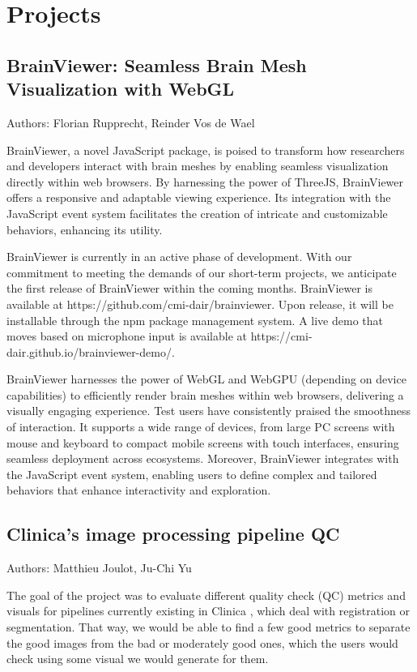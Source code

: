 \documentclass{article}
\begin{document}
\section{Projects}

\subsection{BrainViewer: Seamless Brain Mesh Visualization with WebGL}
Authors: Florian Rupprecht, Reinder Vos de Wael

BrainViewer, a novel JavaScript package, is poised to transform how researchers and developers interact with brain meshes by enabling seamless visualization directly within web browsers. By harnessing the power of ThreeJS, BrainViewer offers a responsive and adaptable viewing experience. Its integration with the JavaScript event system facilitates the creation of intricate and customizable behaviors, enhancing its utility.

BrainViewer is currently in an active phase of development. With our commitment to meeting the demands of our short-term projects, we anticipate the first release of BrainViewer within the coming months. BrainViewer is available at https://github.com/cmi-dair/brainviewer. Upon release, it will be installable through the npm package management system. A live demo that moves based on microphone input is available at https://cmi-dair.github.io/brainviewer-demo/.

BrainViewer harnesses the power of WebGL and WebGPU (depending on device capabilities) to efficiently render brain meshes within web browsers, delivering a visually engaging experience. Test users have consistently praised the smoothness of interaction. It supports a wide range of devices, from large PC screens with mouse and keyboard to compact mobile screens with touch interfaces, ensuring seamless deployment across ecosystems. Moreover, BrainViewer integrates with the JavaScript event system, enabling users to define complex and tailored behaviors that enhance interactivity and exploration.

\subsection{Clinica's image processing pipeline QC}
Authors: Matthieu Joulot, Ju-Chi Yu

The goal of the project was to evaluate different quality check (QC) metrics and visuals for pipelines currently existing in Clinica \cite{routier2021clinica}, which deal with registration or segmentation. That way, we would be able to find a few good metrics to separate the good images from the bad or moderately good ones, which the users would check using some visual we would generate for them.
\end{document}
